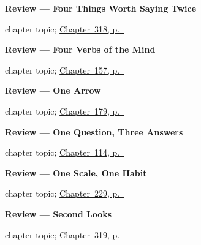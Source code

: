 \noindent\begin{minipage}[t]{\linewidth}
\raggedright
\textbf{Review --- Four Things Worth Saying Twice}\par
\footnotesize chapter topic; \hyperref[ch:repaso-pre-a1]{Chapter~318, p.~\pageref*{ch:repaso-pre-a1}}
\end{minipage}\par\smallskip

\noindent\begin{minipage}[t]{\linewidth}
\raggedright
\textbf{Review --- Four Verbs of the Mind}\par
\footnotesize chapter topic; \hyperref[ch:spanish-review-verbs-of-mind]{Chapter~157, p.~\pageref*{ch:spanish-review-verbs-of-mind}}
\end{minipage}\par\smallskip

\noindent\begin{minipage}[t]{\linewidth}
\raggedright
\textbf{Review --- One Arrow}\par
\footnotesize chapter topic; \hyperref[ch:review-por-para]{Chapter~179, p.~\pageref*{ch:review-por-para}}
\end{minipage}\par\smallskip

\noindent\begin{minipage}[t]{\linewidth}
\raggedright
\textbf{Review --- One Question, Three Answers}\par
\footnotesize chapter topic; \hyperref[ch:review-two-pasts]{Chapter~114, p.~\pageref*{ch:review-two-pasts}}
\end{minipage}\par\smallskip

\noindent\begin{minipage}[t]{\linewidth}
\raggedright
\textbf{Review --- One Scale, One Habit}\par
\footnotesize chapter topic; \hyperref[ch:repaso-grado]{Chapter~229, p.~\pageref*{ch:repaso-grado}}
\end{minipage}\par\smallskip

\noindent\begin{minipage}[t]{\linewidth}
\raggedright
\textbf{Review --- Second Looks}\par
\footnotesize chapter topic; \hyperref[ch:repaso-la-superficie]{Chapter~319, p.~\pageref*{ch:repaso-la-superficie}}
\end{minipage}\par\smallskip

